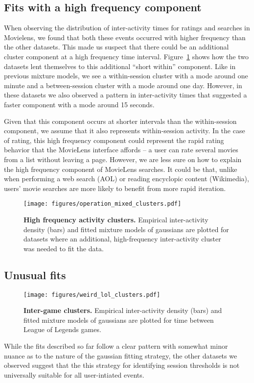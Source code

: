 \subsection{Fits with a high frequency component}
When observing the distribution of inter-activity times for ratings and searches in Movielens, we found that both these events occurred with higher frequency than the other datasets.  This made us suspect that there could be an additional cluster component at a high frequency time interval.  Figure~\ref{fig:operation_mixed_clusters} shows how the two datasets lent themselves to this additional ``short within'' component.  Like in previous mixture models, we see a within-session cluster with a mode around one minute and a between-session cluster with a mode around one day.  However, in these datasets we also observed a pattern in inter-activity times that suggested a faster component with a mode around 15 seconds.

Given that this component occurs at shorter intervals than the within-session component, we assume that it also represents within-session activity.  In the case of rating, this high frequency component could represent the rapid rating behavior that the MovieLens interface affords -- a user can rate several movies from a list without leaving a page.  However, we are less sure on how to explain the high frequency component of MovieLens searches.  It could be that, unlike when performing a web search (AOL) or reading encyclopic content (Wikimedia), users' movie searches are more likely to benefit from more rapid iteration.
\begin{figure}
\centering
\texttt{[image: figures/operation\_mixed\_clusters.pdf]}
\caption{
    \textbf{High frequency activity clusters.} Empirical inter-activity density (bars) and fitted mixture models of gaussians are plotted for datasets where an additional, high-frequency inter-activity cluster was needed to fit the data.
}
\label{fig:operation_mixed_clusters}
\end{figure}

\subsection{Unusual fits}
\begin{figure}
\centering
\texttt{[image: figures/weird\_lol\_clusters.pdf]}
\caption{
    \textbf{Inter-game clusters.} Empirical inter-activity density (bars) and fitted mixture models of gaussians are plotted for time between League of Legends games.
}
\label{fig:lol_game_clusters}
\end{figure}
While the fits described so far follow a clear pattern with somewhat minor nuance as to the nature of the gaussian fitting strategy, the other datasets we observed suggest that the this strategy for identifying session thresholds is not universally suitable for all user-intiated events.

